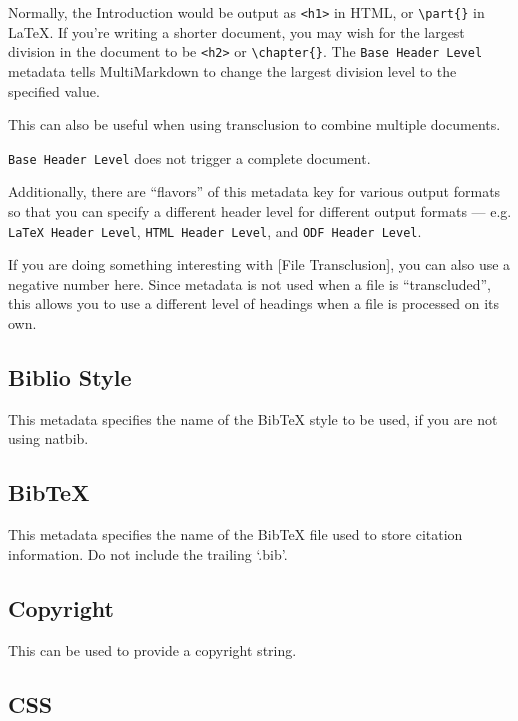 Normally, the Introduction would be output as \texttt{<h1>} in HTML, or \texttt{\textbackslash{}part\{\}} in LaTeX. If you're writing a shorter document, you may wish for the largest division in the document to be \texttt{<h2>} or \texttt{\textbackslash{}chapter\{\}}. The \texttt{Base Header Level} metadata tells MultiMarkdown to change the largest division level to the specified value.

This can also be useful when using transclusion to combine multiple documents.

\texttt{Base Header Level} does not trigger a complete document.

Additionally, there are ``flavors'' of this metadata key for various output formats so that you can specify a different header level for different output formats --- e.g. \texttt{LaTeX Header Level}, \texttt{HTML Header Level}, and \texttt{ODF Header Level}.

If you are doing something interesting with {[File Transclusion]}, you can also use a negative number here. Since metadata is not used when a file is ``transcluded'', this allows you to use a different level of headings when a file is processed on its own.

\subsection{Biblio Style }
\label{bibliostyle}

This metadata specifies the name of the BibTeX style to be used, if you are
not using natbib.

\subsection{BibTeX }
\label{bibtex}

This metadata specifies the name of the BibTeX file used to store citation
information. Do not include the trailing `.bib'.

\subsection{Copyright }
\label{copyright}

This can be used to provide a copyright string.

\subsection{CSS }
\label{css}


